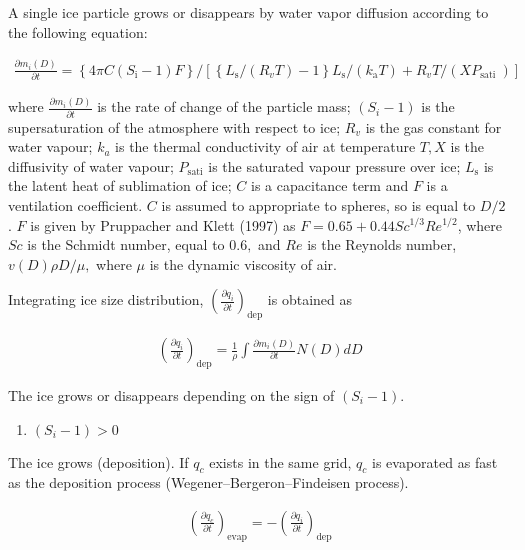 A single ice particle grows or disappears by water vapor diffusion according to the following equation:

\begin{eqnarray}
\frac{\partial m_i(D)}{\partial t}=\left\{4 \pi C\left(S_{\mathrm{i}}-1\right) F\right\} /\left[\left\{L_{\mathrm{s}} /(R_{v} T)-1\right\} L_{\mathrm{s}} /\left(k_{\mathrm{a}} T\right)+R_v T /\left(X P_{\text {sati }}\right)\right]
\end{eqnarray}

where \(\frac{\partial m_i(D)}{\partial t}\) is the rate of change of the particle mass; \((S_i - 1)\) is the supersaturation of the atmosphere with respect to ice; \(R_v\) is the gas constant for
water vapour; \(k_a\) is the thermal conductivity of air at temperature \(T, X\) is the diffusivity of water vapour; \(P_{\text {sati}}\) is the saturated vapour pressure over ice; \(L_{\mathrm{s}}\)
is the latent heat of sublimation of ice; \(C\) is a capacitance term and \(F\) is a ventilation coefficient. \(C\) is assumed to appropriate to spheres, so is equal to \(D/2\) . \(F\) is given by
Pruppacher and Klett (1997) as \(F=0.65+0.44 S c^{1 / 3} R e^{1 / 2}\), where \(S c\) is the Schmidt number, equal to \(0.6,\) and \(R e\) is the Reynolds number, \(v(D) \rho D / \mu,\) where \(\mu\)
is the dynamic viscosity of air.

Integrating ice size distribution, \(\left(\frac{\partial q_i}{\partial t}\right)_{\text {dep}}\) is obtained as

\begin{eqnarray}
\left(\frac{\partial q_i}{\partial t}\right)_{\text {dep}}
= \frac{1}{\rho}\int \frac{\partial m_i(D)}{\partial t}N(D)dD
\end{eqnarray}

The ice grows or disappears depending on the sign of \((S_i - 1)\).

\begin{enumerate}
\def\labelenumi{\arabic{enumi}.}
\tightlist
\item
  \((S_i - 1)>0\)
\end{enumerate}

The ice grows (deposition). If \(q_c\) exists in the same grid, \(q_c\) is evaporated as fast as the deposition process (Wegener--Bergeron--Findeisen process).

\begin{eqnarray}
\left(\frac{\partial q_c}{\partial t}\right)_{\text {evap}}
=-\left(\frac{\partial q_i}{\partial t}\right)_{\text {dep}}
\end{eqnarray}

